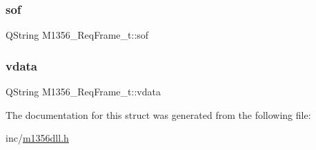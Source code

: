 \subsubsection{\texorpdfstring{sof}{sof}}
{\footnotesize\ttfamily Q\+String M1356\+\_\+\+Req\+Frame\+\_\+t\+::sof}

\mbox{\label{struct_m1356___req_frame__t_afdc84411b144531c4f7270f323fd9e40}} 
\subsubsection{\texorpdfstring{vdata}{vdata}}
{\footnotesize\ttfamily Q\+String M1356\+\_\+\+Req\+Frame\+\_\+t\+::vdata}



The documentation for this struct was generated from the following file\+:\begin{DoxyCompactItemize}
\item 
inc/\mbox{\hyperlink{m1356dll_8h}{m1356dll.\+h}}\end{DoxyCompactItemize}
